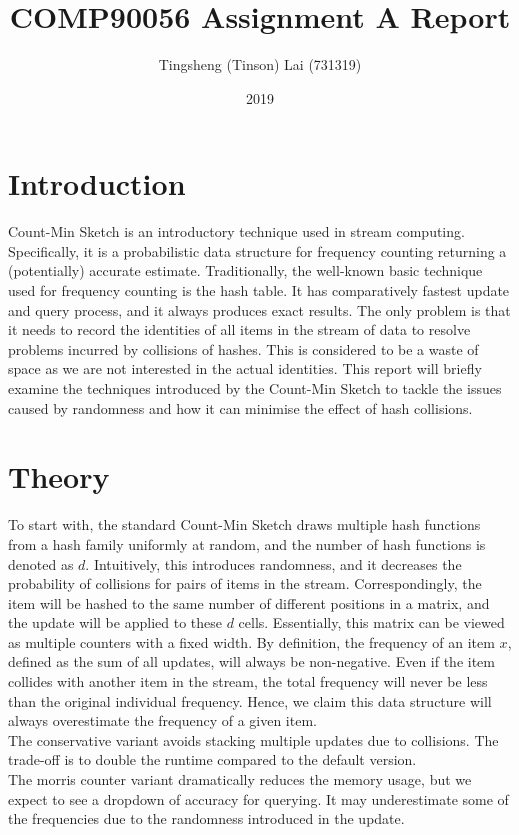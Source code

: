 \documentclass[a4paper, 11pt]{article}
\title{\textbf{COMP90056 Assignment A Report}}
\author{Tingsheng (Tinson) Lai (731319)}
\date{2019}
\begin{document}
    \maketitle
    \section{Introduction}
    Count-Min Sketch is an introductory technique used in stream computing. Specifically, it is a probabilistic data structure for frequency counting returning a (potentially) accurate estimate. Traditionally, the well-known basic technique used for frequency counting is the hash table. It has comparatively fastest update and query process, and it always produces exact results. The only problem is that it needs to record the identities of all items in the stream of data to resolve problems incurred by collisions of hashes. This is considered to be a waste of space as we are not interested in the actual identities. This report will briefly examine the techniques introduced by the Count-Min Sketch to tackle the issues caused by randomness and how it can minimise the effect of hash collisions.
    \section{Theory}
        To start with, the standard Count-Min Sketch draws multiple hash functions from a hash family uniformly at random, and the number of hash functions is denoted as $d$. Intuitively, this introduces randomness, and it decreases the probability of collisions for pairs of items in the stream. Correspondingly, the item will be hashed to the same number of different positions in a matrix, and the update will be applied to these $d$ cells. Essentially, this matrix can be viewed as multiple counters with a fixed width. By definition, the frequency of an item $x$, defined as the sum of all updates, will always be non-negative. Even if the item collides with another item in the stream, the total frequency will never be less than the original individual frequency. Hence, we claim this data structure will always overestimate the frequency of a given item. \\

        \noindent The conservative variant avoids stacking multiple updates due to collisions. The trade-off is to double the runtime compared to the default version. \\

        \noindent The morris counter variant dramatically reduces the memory usage, but we expect to see a dropdown of accuracy for querying. It may underestimate some of the frequencies due to the randomness introduced in the update. \\
\end{document}

